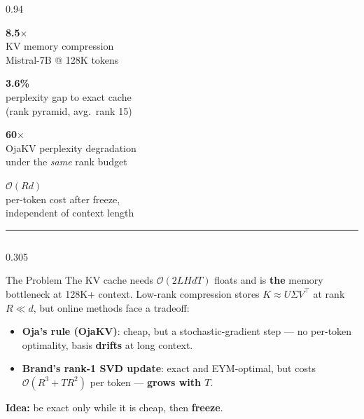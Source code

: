 \documentclass[final]{beamer}
\newcommand{\takeaway}[1]{%
  \begin{center}
  \colorbox{soft}{\parbox{0.96\linewidth}{\vspace{0.35cm}\centering\large #1\vspace{0.35cm}}}
  \end{center}}
\newcommand{\stat}[3]{%
  \begin{minipage}[t]{0.235\linewidth}\centering
    {\fontsize{76}{76}\selectfont\bfseries\color{#1}#2}\\[0.4cm]
    {\large #3}
  \end{minipage}}
\begin{document}
\begin{frame}[t]
\vspace{0.5cm}

\begin{columns}[t]
\begin{column}{0.94\paperwidth}
\stat{accent}{8.5$\times$}{KV memory compression\\ Mistral-7B @ 128K tokens}\hfill
\stat{good}{3.6\%}{perplexity gap to exact cache\\ (rank pyramid, avg.\ rank 15)}\hfill
\stat{bad}{60$\times$}{OjaKV perplexity degradation\\ under the \emph{same} rank budget}\hfill
\stat{teal}{$\mathcal{O}(Rd)$}{per-token cost after freeze,\\ independent of context length}
\par\vspace{0.4cm}
{\color{muted!40}\rule{\linewidth}{2pt}}
\end{column}
\end{columns}

\vspace{0.4cm}

\begin{columns}[t]
\begin{column}{0.305\paperwidth}

\begin{block}{The Problem}
The KV cache needs $\mathcal{O}(2LHdT)$ floats and is \textbf{the} memory
bottleneck at 128K+ context. Low-rank compression stores
$K \approx U\Sigma V^\top$ at rank $R \ll d$, but online methods face a tradeoff:
\vspace{0.3cm}
\begin{itemize}
  \item \textbf{Oja's rule (OjaKV)}: cheap, but a stochastic-gradient step
        --- no per-token optimality, basis \textbf{drifts} at long context.
  \item \textbf{Brand's rank-1 SVD update}: exact and EYM-optimal, but costs
        $\mathcal{O}(R^3 + TR^2)$ per token --- \textbf{grows with $T$}.
\end{itemize}
\takeaway{\textbf{Idea:} be exact only while it is cheap, then \textbf{freeze}.}
\end{block}


\end{column}
\end{columns}
\end{frame}
\end{document}

